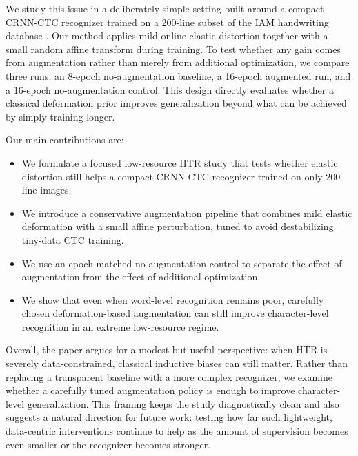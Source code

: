 \documentclass{article} %
\begin{document}
We study this issue in a deliberately simple setting built around a compact CRNN-CTC recognizer trained on a 200-line subset of the IAM handwriting database \citep{marti2002iam,shi2016crnn,graves2006ctc}. Our method applies mild online elastic distortion together with a small random affine transform during training. To test whether any gain comes from augmentation rather than merely from additional optimization, we compare three runs: an 8-epoch no-augmentation baseline, a 16-epoch augmented run, and a 16-epoch no-augmentation control. This design directly evaluates whether a classical deformation prior improves generalization beyond what can be achieved by simply training longer.

Our main contributions are:
\begin{itemize}
    \item We formulate a focused low-resource HTR study that tests whether elastic distortion still helps a compact CRNN-CTC recognizer trained on only 200 line images.
    \item We introduce a conservative augmentation pipeline that combines mild elastic deformation with a small affine perturbation, tuned to avoid destabilizing tiny-data CTC training.
    \item We use an epoch-matched no-augmentation control to separate the effect of augmentation from the effect of additional optimization.
    \item We show that even when word-level recognition remains poor, carefully chosen deformation-based augmentation can still improve character-level recognition in an extreme low-resource regime.
\end{itemize}

Overall, the paper argues for a modest but useful perspective: when HTR is severely data-constrained, classical inductive biases can still matter. Rather than replacing a transparent baseline with a more complex recognizer, we examine whether a carefully tuned augmentation policy is enough to improve character-level generalization. This framing keeps the study diagnostically clean and also suggests a natural direction for future work: testing how far such lightweight, data-centric interventions continue to help as the amount of supervision becomes even smaller or the recognizer becomes stronger.
\end{document}
